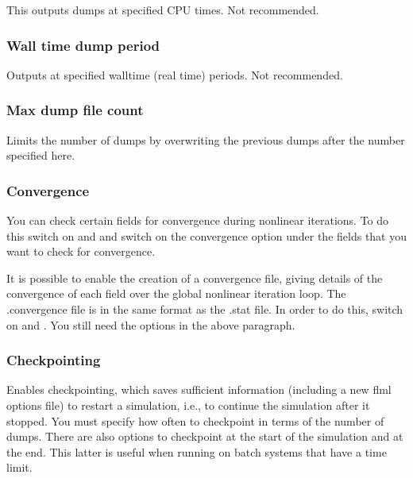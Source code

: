 This outputs dumps at specified CPU times. Not recommended.

\subsubsection{Wall time dump period}

Outputs at specified walltime (real time) periods. Not recommended.

\subsubsection{Max dump file count}

Limits the number of dumps by overwriting the previous dumps after the number specified here.

\subsubsection{Convergence}

You can check certain fields for convergence during nonlinear iterations.  To do this switch on  and  and switch on the convergence option under the fields that you want to check for convergence. 

It is possible to enable the creation of a convergence file, giving details of the convergence of each field over the global nonlinear iteration loop. The .convergence file is in the same format as the .stat file. In order to do this, switch on 
  and .  You still need the options in the above paragraph.

\subsubsection{Checkpointing}
\label{sec:configuring_fluidity_checkpointing}
Enables checkpointing, which saves sufficient information (including a new flml options file) to restart a simulation, i.e., to continue the simulation after it stopped. You must specify how often to checkpoint in terms of the number of dumps. There
are also options to checkpoint at the start of the simulation and at the
end. This latter is useful when running on batch systems that have a time
limit.


